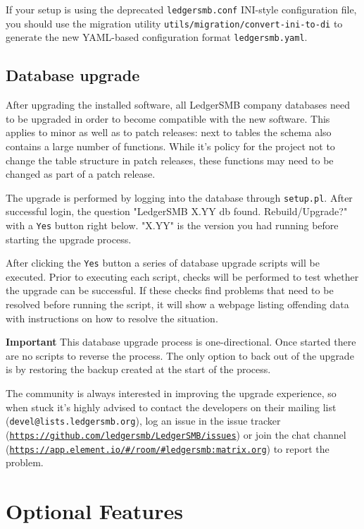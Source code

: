 If your setup is using the deprecated \texttt{ledgersmb.conf} INI-style configuration
file, you should use the migration utility \texttt{utils/migration/convert-ini-to-di}
to generate the new YAML-based configuration format \texttt{ledgersmb.yaml}.

\section{Database upgrade}
\label{sec-updates-database-upgrades}

After upgrading the installed software, all LedgerSMB company databases need to be
upgraded in order to become compatible with the new software.  This applies to minor
as well as to patch releases: next to tables the schema
also contains a large number of functions.  While it's policy for the project not to
change the table structure in patch releases, these functions may need to be changed
as part of a patch release.

The upgrade is
performed by logging into the database through \texttt{setup.pl}.  After successful
login, the question "LedgerSMB X.YY db found. Rebuild/Upgrade?" with a \texttt{Yes}
button right below. "X.YY" is the version you had running before starting the upgrade
process.

After clicking the \texttt{Yes} button a series of database upgrade scripts will be
executed.  Prior to executing each script, checks will be performed to test whether
the upgrade can be successful.  If these checks find problems that need to be resolved
before running the script, it will show a webpage listing offending data with instructions
on how to resolve the situation.

\textbf{Important} This database upgrade process is one-directional.  Once started
there are no scripts to reverse the process.  The only option to back out of the
upgrade is by restoring the backup created at the start of the process.

The community is always interested in improving the upgrade experience, so when stuck
it's highly advised to contact the developers on their mailing list
(\texttt{devel@lists.ledgersmb.org}), log an issue in the issue tracker
(\texttt{\url{https://github.com/ledgersmb/LedgerSMB/issues}}) or join the chat channel
(\texttt{\url{https://app.element.io/\#/room/\#ledgersmb:matrix.org}})
to report the problem.

\chapter{Optional Features}
\label{cha-options}

